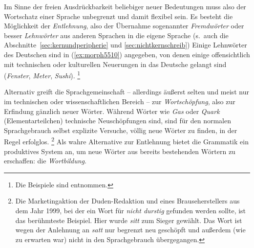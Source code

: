 Im Sinne der freien Ausdrückbarkeit beliebiger neuer Bedeutungen muss also der Wortschatz einer Sprache unbegrenzt und damit flexibel sein.
Es besteht die Möglichkeit der \textit{Entlehnung}, also der Übernahme sogenannter \textit{Fremdwörter} oder besser \textit{Lehnwörter} aus anderen Sprachen in die eigene Sprache (s.\ auch die Abschnitte~\ref{sec:kernundperipherie} und \ref{sec:nichtkernschreib})
Einige Lehnwörter des Deutschen sind in (\ref{ex:morph5510}) angegeben, von denen einige offensichtlich mit technischen oder kulturellen Neuerungen in das Deutsche gelangt sind (\textit{Fenster}, \textit{Meter}, \textit{Sushi}).%
\footnote{Die Beispiele sind \citet{Kluge02} entnommen.}

\Enl

\begin{exe}
  \ex \label{ex:morph5510}
  \begin{xlist}
  \end{xlist}
\end{exe}

Alternativ greift die Sprachgemeinschaft -- allerdings äußerst selten und meist nur im technischen oder wissenschaftlichen Bereich -- zur \textit{Wortschöpfung}, also zur Erfindung gänzlich neuer Wörter.
Während Wörter wie \textit{Gas} oder \textit{Quark} (Elementarteilchen) technische Neuschöpfungen sind, sind für den normalen Sprachgebrauch selbst explizite Versuche, völlig neue Wörter zu finden, in der Regel erfolglos.%
\footnote{Die Marketingaktion der Duden-Redaktion und eines Brauseherstellers aus dem Jahr 1999, bei der ein Wort für \textit{nicht durstig} gefunden werden sollte, ist das berühmteste Beispiel.
Hier wurde \textit{sitt} zum Sieger gewählt.
Das Wort ist wegen der Anlehnung an \textit{satt} nur begrenzt neu geschöpft und außerdem (wie zu erwarten war) nicht in den Sprachgebrauch übergegangen.}
Als wahre Alternative zur Entlehnung bietet die Grammatik ein produktives System an, um neue Wörter aus bereits bestehenden Wörtern zu erschaffen: die \textit{Wortbildung}.

